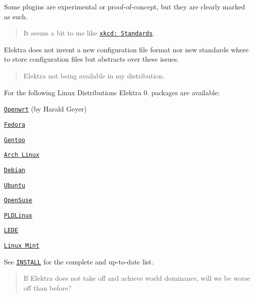 Some plugins are experimental or proof-\/of-\/concept, but they are clearly marked as such.

\begin{quote}
It seems a bit to me like \href{https://xkcd.com/927/}{\tt xkcd\+: Standards}. \end{quote}


Elektra does not invent a new configuration file format nor new standards where to store configuration files but abstracts over these issues.

\begin{quote}
Elektra not being available in my distribution. \end{quote}


For the following Linux Distributions Elektra 0. packages are available\+:


\begin{DoxyItemize}
\item \href{https://github.com/openwrt/packages/tree/master/libs/elektra}{\tt Openwrt} (by Harald Geyer)
\item \href{https://admin.fedoraproject.org/pkgdb/package/elektra/}{\tt Fedora}
\item \href{http://packages.gentoo.org/package/app-admin/elektra}{\tt Gentoo}
\item \href{https://aur.archlinux.org/packages/elektra/}{\tt Arch Linux}
\item \href{https://packages.debian.org/de/jessie/libelektra4}{\tt Debian}
\item \href{https://launchpad.net/ubuntu/+source/elektra}{\tt Ubuntu}
\item \href{https://software.opensuse.org/package/elektra}{\tt Open\+Suse}
\item \href{http://sophie.zarb.org/rpms/763d9e52beefaa15b1363d11d836b65c}{\tt P\+L\+D\+Linux}
\item \href{https://lede-project.org/packages/pkgdata/libelektra-core?s[]=elektra}{\tt L\+E\+DE}
\item \href{https://community.linuxmint.com/software/view/elektra-bin}{\tt Linux Mint}
\end{DoxyItemize}

See \href{https://www.libelektra.org/docgettingstarted/installation}{\tt I\+N\+S\+T\+A\+LL} for the complete and up-\/to-\/date list.

\begin{quote}
If Elektra does not take off and achieve world dominance, will we be worse off than before? \end{quote}


